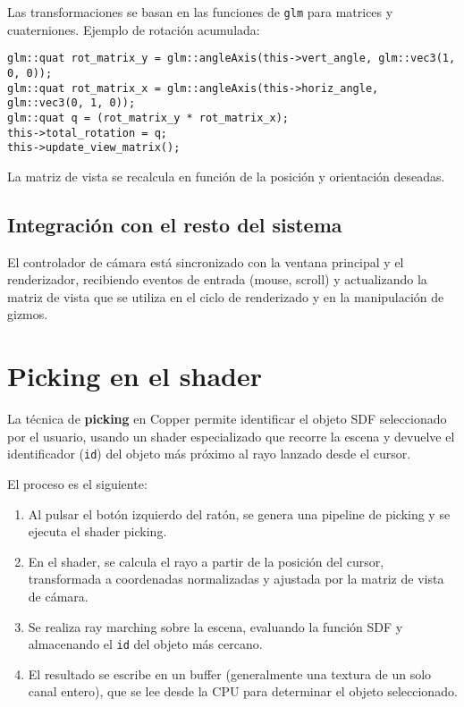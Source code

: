Las transformaciones se basan en las funciones de \texttt{glm} para matrices y
cuaterniones. Ejemplo de rotación acumulada:
\begin{verbatim}
glm::quat rot_matrix_y = glm::angleAxis(this->vert_angle, glm::vec3(1, 0, 0));
glm::quat rot_matrix_x = glm::angleAxis(this->horiz_angle, glm::vec3(0, 1, 0));
glm::quat q = (rot_matrix_y * rot_matrix_x);
this->total_rotation = q;
this->update_view_matrix();
\end{verbatim}
La matriz de vista se recalcula en función de la posición y orientación
deseadas.

\subsection{Integración con el resto del sistema}

El controlador de cámara está sincronizado con la ventana principal y el
renderizador, recibiendo eventos de entrada (mouse, scroll) y actualizando la
matriz de vista que se utiliza en el ciclo de renderizado y en la manipulación
de gizmos.

\section{Picking en el shader}

La técnica de \textbf{picking} en Copper permite identificar el objeto SDF
seleccionado por el usuario, usando un shader especializado que recorre la
escena y devuelve el identificador (\texttt{id}) del objeto más próximo al rayo
lanzado desde el cursor.

El proceso es el siguiente:

\begin{enumerate}
    \item Al pulsar el botón izquierdo del ratón, se genera una pipeline de picking y se
          ejecuta el shader picking.
    \item En el shader, se calcula el rayo a partir de la posición del cursor,
          transformada a coordenadas normalizadas y ajustada por la matriz de vista de
          cámara.
    \item Se realiza ray marching sobre la escena, evaluando la función SDF y almacenando
          el \texttt{id} del objeto más cercano.
    \item El resultado se escribe en un buffer (generalmente una textura de un solo canal
          entero), que se lee desde la CPU para determinar el objeto seleccionado.
\end{enumerate}

